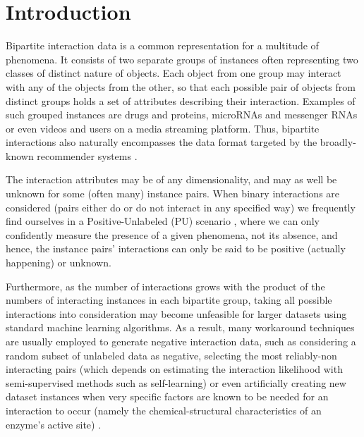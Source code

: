 
\chapter[Introduction]{Introduction}\label{Introduction}

Bipartite interaction data is a common representation for a multitude of
phenomena. It consists of two separate groups of instances often representing
two classes of distinct nature of objects. Each object from one group may
interact with any of the objects from the other, so that each possible pair of
objects from distinct groups holds a set of attributes describing their
interaction. Examples of such grouped instances are drugs and proteins,
microRNAs and messenger RNAs or even videos and users on a media streaming
platform. Thus, bipartite interactions also naturally encompasses the data
format targeted by the broadly-known recommender systems \cite{}.


The interaction attributes may be of any dimensionality, and may as well be
unknown for some (often many) instance pairs. When binary interactions are
considered (pairs either do or do not interact in any specified way) we
frequently find ourselves in a Positive-Unlabeled (PU) scenario \cite{}, where
we can only confidently measure the presence of a given phenomena, not its
absence, and hence, the instance pairs' interactions can only be said to be
positive (actually happening) or unknown.


Furthermore, as the number of interactions grows with the product of the numbers
of interacting instances in each bipartite group, taking all possible
interactions into consideration may become unfeasible for larger datasets using
standard machine learning algorithms. As a result, many workaround techniques
are usually employed to generate negative interaction data, such as considering
a random subset of unlabeled data as negative\cite{Zhang_2018, Zitnik_2018,
Huang_2021}, selecting the most reliably-non interacting pairs (which depends on
estimating the interaction likelihood with semi-supervised methods such as
self-learning)\cite{} or even artificially creating new dataset instances when
very specific factors are known to be needed for an interaction to occur (namely
the chemical-structural characteristics of an enzyme's active site) \cite{}.

